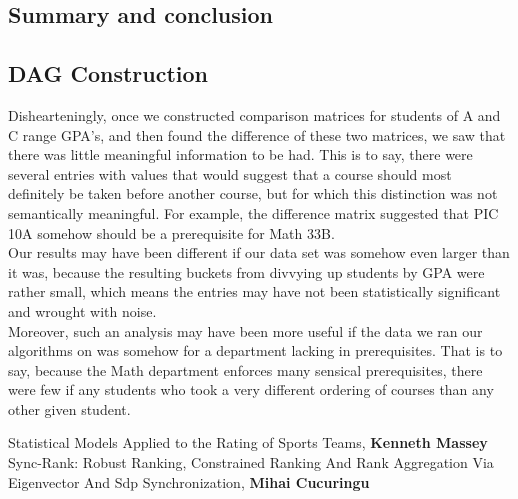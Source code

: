 \documentclass[10pt]{siamltex}
\begin{document}
\begin{pagewiselinenumbers}
\section{Summary and conclusion}  \label{sec:conclusion}
\subsection{DAG Construction}
Dishearteningly, once we constructed comparison matrices for students of A and C range GPA's, and then found the difference of these two matrices, we saw that there was little meaningful information to be had. This is to say, there were several entries with values that would suggest that a course should most definitely be taken before another course, but for which this distinction was not semantically meaningful. For example, the difference matrix suggested that PIC 10A somehow should be a prerequisite for Math 33B.\\

Our results may have been different if our data set was somehow even larger than it was, because the resulting buckets from divvying up students by GPA were rather small, which means the entries may have not been statistically significant and wrought with noise.\\

Moreover, such an analysis may have been more useful if the data we ran our algorithms on was somehow for a department lacking in prerequisites. That is to say, because the Math department enforces many sensical prerequisites, there were few if any students who took a very different ordering of courses than any other given student.


\begin{thebibliography}{1}
 Statistical Models Applied to the Rating of Sports Teams, \textbf{Kenneth Massey} 
 Sync-Rank: Robust Ranking, Constrained Ranking And Rank Aggregation Via Eigenvector And Sdp Synchronization, \textbf{Mihai Cucuringu}

\end{thebibliography}

\end{pagewiselinenumbers}
\end{document}
